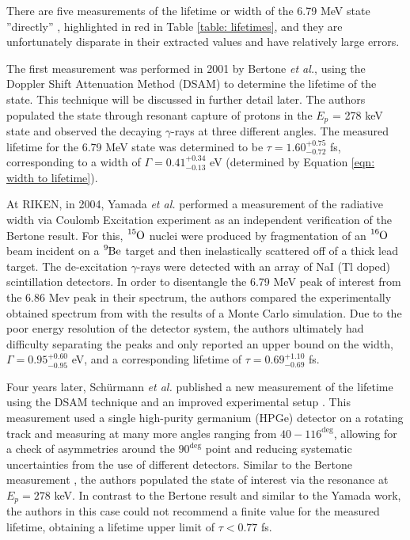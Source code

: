 There are five measurements of the lifetime or width of the 6.79 MeV state ''directly'' \cite{Bertone2001, Yamada2004, Schurmann2008, Galinski2014, Michelagnoli2013}, highlighted in red in Table \ref{table: lifetimes}, and they are unfortunately disparate in their extracted values and have relatively large errors. 

The first measurement was performed in 2001 by Bertone \textit{et al.}, using the Doppler Shift Attenuation Method (DSAM) to determine the lifetime of the state. This technique will be discussed in further detail later. The authors populated the state through resonant capture of protons in the $E_{p}$ = 278 keV state and observed the decaying $\gamma$-rays at three different angles. The measured lifetime for the 6.79 MeV state was determined to be $\tau = 1.60^{+0.75}_{-0.72}$ fs, corresponding to a width of $\Gamma = 0.41^{+0.34}_{-0.13}$ eV (determined by Equation \ref{eqn: width to lifetime}). 

At RIKEN, in 2004, Yamada \textit{et al.} performed a measurement of the radiative width via Coulomb Excitation experiment \cite{Yamada2004} as an independent verification of the Bertone result. For this, $\ce{^{15}O}$ nuclei were produced by fragmentation of an $\ce{^{16}O}$ beam incident on a $\ce{^{9}Be}$ target and then inelastically scattered off of a thick lead target. The de-excitation $\gamma$-rays were detected with an array of NaI (Tl doped) scintillation detectors. In order to disentangle the 6.79 MeV peak of interest from the 6.86 Mev peak in their spectrum, the authors compared the experimentally obtained spectrum from with the results of a Monte Carlo simulation. Due to the poor energy resolution of the detector system, the authors ultimately had difficulty separating the peaks and only reported an upper bound on the width, $\Gamma = 0.95^{+0.60}_{-0.95}$ eV, and a corresponding lifetime of $\tau = 0.69 ^{+1.10}_{-0.69}$ fs. 

Four years later, Sch{\"u}rmann \textit{et al.} published a new measurement of the lifetime using the DSAM technique and an improved experimental setup \cite{Schurmann2008}. This measurement used a single high-purity germanium (HPGe) detector on a rotating track and measuring at many more angles ranging from $40 - 116^{\deg}$, allowing for a check of asymmetries around the $90^{\deg}$ point and reducing systematic uncertainties from the use of different detectors. Similar to the Bertone measurement \cite{Bertone2001}, the authors populated the state of interest via the resonance at $E_{p} = 278$ keV. In contrast to the Bertone result and similar to the Yamada work, the authors in this case could not recommend a finite value for the measured lifetime, obtaining a lifetime upper limit of $\tau < 0.77$ fs. 

